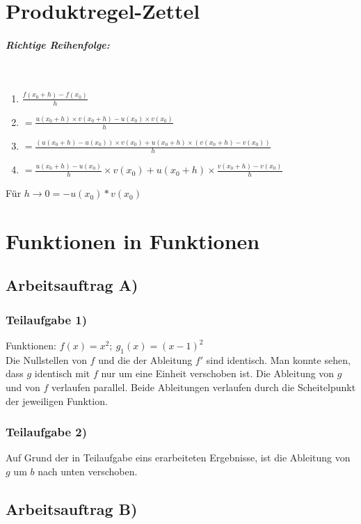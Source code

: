 \documentclass[11pt, a4paper]{report}
\begin{document}
	
	\chapter{Produktregel-Zettel}
	
	\paragraph{Richtige Reihenfolge:} \mbox{} \\
	
	\begin{enumerate}
		\item $\frac{f(x_0 + h) - f(x_0)}{h}$
		\item $= \frac{u(x_0 + h) \times v(x_0 + h) - u(x_0) \times v(x_0)}{h}$
		\item $= \frac{(u(x_0 + h) - u(x_0)) \times v(x_0) + u(x_0 + h) \times (v(x_0 + h) - v(x_0))}{h}$
		\item $= \frac{u(x_0 + h) - u(x_0)}{h} \times v (x_0) + u(x_0 + h) \times \frac{v(x_0 +h) - v(x_0)}{h}$
	\end{enumerate}
	
	Für $h \to 0 = -u(x_0)*v(x_0)$
	
	\chapter{Funktionen in Funktionen}
	\section{Arbeitsauftrag A)}
	\subsection{Teilaufgabe 1)}
	Funktionen: $f(x) = x^2;\ g_1(x) = (x - 1)^2$ \\
	Die Nullstellen von $f$ und die der Ableitung $f'$ sind identisch.
	Man konnte sehen, dass $g$ identisch mit $f$ nur um eine Einheit verschoben ist.
	Die Ableitung von $g$ und von $f$ verlaufen parallel.
	Beide Ableitungen verlaufen durch die Scheitelpunkt der jeweiligen Funktion.
	\subsection{Teilaufgabe 2)}
	Auf Grund der in Teilaufgabe eins erarbeiteten Ergebnisse, ist die Ableitung von $g$ um $b$ nach unten verschoben.
	\section{Arbeitsauftrag B)}
\end{document}
